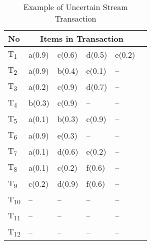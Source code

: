 %
%
\begin{table}[ht]
\centering

\begin{tabular}{|l|l|l|l|l|l|}
\hline
	No & \multicolumn{4}{c|}{Items in Transaction} \\ \hline \hline
	T\textsubscript{1} & a(0.9) & c(0.6) & d(0.5) & e(0.2)			\\\hline
	T\textsubscript{2} & a(0.9) & b(0.4) & e(0.1) & --    			\\\hline
	T\textsubscript{3} & a(0.2) & c(0.9) & d(0.7) & --    			\\\hline
	T\textsubscript{4} & b(0.3) & c(0.9) & -- & --			\\\hline
	T\textsubscript{5} & a(0.1) & b(0.3) & c(0.9) & --    			\\\hline
	T\textsubscript{6} & a(0.9) & e(0.3) & -- & --        			\\\hline
   	T\textsubscript{7} & a(0.1) & d(0.6) & e(0.2) & --		\\\hline
	T\textsubscript{8} & a(0.1) & c(0.2) & f(0.6) & --    			\\\hline
	T\textsubscript{9} & c(0.2) & d(0.9) & f(0.6) & --    			\\\hline
	
	T\textsubscript{10} &  --  &  --  &  --  & --    				\\\hline
	T\textsubscript{11} &  --  &  --  &  --  & --    				\\\hline
	T\textsubscript{12} &  --  &  --  &  --  & --    				\\\hline
	
		
\end{tabular}
\label{tab:ex_u}
\caption{Example of Uncertain Stream Transaction}
\label{table:uncertain_stream_transaction}
\end{table}
%